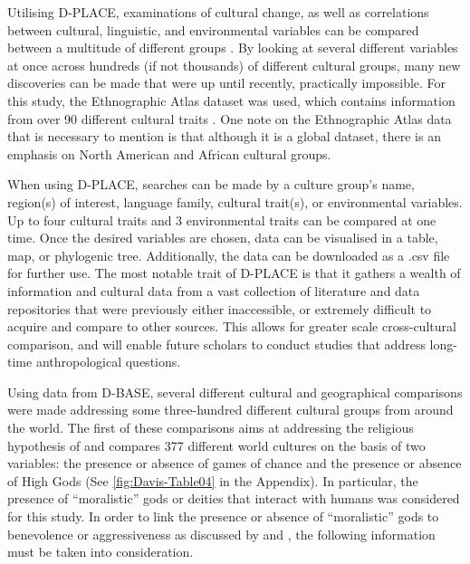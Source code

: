 \documentclass[%
	]{ijsra}
\begin{document}
 Utilising D-PLACE, examinations of cultural change, as well as correlations between cultural, linguistic, and environmental variables can be compared between a multitude of different groups \parencite{kirby2016}. By looking at several different variables at once across hundreds (if not thousands) of different cultural groups, many new discoveries can be made that were up until recently, practically impossible. For this study, the Ethnographic Atlas dataset was used, which contains information from over 90 different cultural traits \parencite{kirby2016}. One note on the Ethnographic Atlas data that is necessary to mention is that although it is a global dataset, there is an emphasis on North American and African cultural groups.
 
 When using D-PLACE, searches can be made by a culture group’s name, region(s) of interest, language family, cultural trait(s), or environmental variables. Up to four cultural traits and 3 environmental traits can be compared at one time. Once the desired variables are chosen, data can be visualised in a table, map, or phylogenic tree. Additionally, the data can be downloaded as a .csv file for further use. The most notable trait of D-PLACE is that it gathers a wealth of information and cultural data from a vast collection of literature and data repositories \parencite{kirby2016} that were previously either inaccessible, or extremely difficult to acquire and compare to other sources. This allows for greater scale cross-cultural comparison, and will enable future scholars to conduct studies that address long-time anthropological questions.


Using data from D-BASE, several different cultural and geographical comparisons were made addressing some three-hundred different cultural groups from around the world. The first of these comparisons aims at addressing the religious hypothesis of \textcite{roberts1959} and compares 377 different world cultures on the basis of two variables: the presence or absence of games of chance and the presence or absence of High Gods (See \cref{fig:Davis-Table04} in the Appendix).%
 In particular, the presence of ``moralistic” gods or deities that interact with humans was considered for this study. In order to link the presence or absence of ``moralistic” gods to benevolence or aggressiveness as discussed by \textcite{lambert1959} and \textcite{roberts1959}, the following information must be taken into consideration. 
\end{document}
